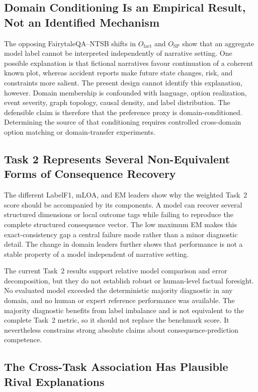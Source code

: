 \documentclass[pdflatex,sn-mathphys-num]{sn-jnl}%
\theoremstyle{thmstyleone}%
\theoremstyle{thmstyletwo}%
\theoremstyle{thmstylethree}%
\begin{document}
\subsection{Domain Conditioning Is an Empirical Result, Not an Identified Mechanism}

The opposing FairytaleQA--NTSB shifts in $O_{\mathrm{fact}}$ and $O_{\mathrm{SP}}$ show that an aggregate model label cannot be interpreted independently of narrative setting. One possible explanation is that fictional narratives favour continuation of a coherent known plot, whereas accident reports make future state changes, risk, and constraints more salient. The present design cannot identify this explanation, however. Domain membership is confounded with language, option realization, event severity, graph topology, causal density, and label distribution. The defensible claim is therefore that the preference proxy is domain-conditioned. Determining the source of that conditioning requires controlled cross-domain option matching or domain-transfer experiments.

\subsection{Task 2 Represents Several Non-Equivalent Forms of Consequence Recovery}

The different LabelF1, mLOA, and EM leaders show why the weighted Task~2 score should be accompanied by its components. A model can recover several structured dimensions or local outcome tags while failing to reproduce the complete structured consequence vector. The low maximum EM makes this exact-consistency gap a central failure mode rather than a minor diagnostic detail. The change in domain leaders further shows that performance is not a stable property of a model independent of narrative setting.

The current Task~2 results support relative model comparison and error decomposition, but they do not establish robust or human-level factual foresight. No evaluated model exceeded the deterministic majority diagnostic in any domain, and no human or expert reference performance was available. The majority diagnostic benefits from label imbalance and is not equivalent to the complete Task~2 metric, so it should not replace the benchmark score. It nevertheless constrains strong absolute claims about consequence-prediction competence.

\subsection{The Cross-Task Association Has Plausible Rival Explanations}
\end{document}

